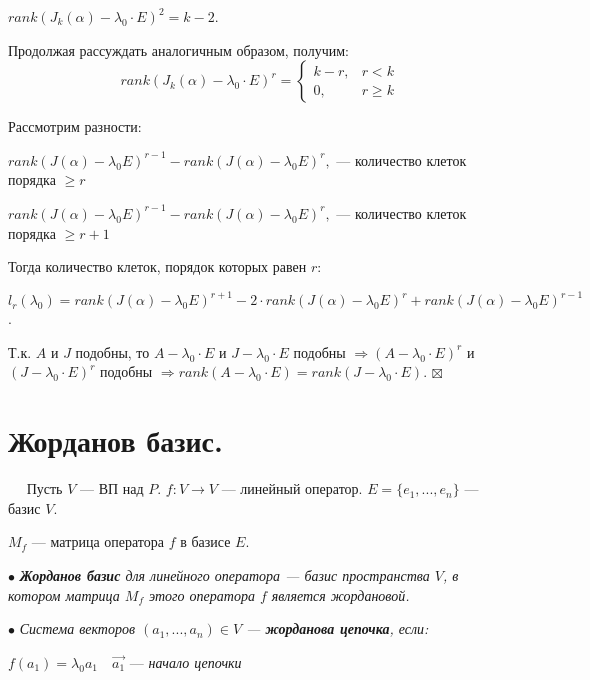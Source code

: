 \documentclass[a4paper, 12pt]{report}
\begin{document}
	$rank(J_k(\alpha) - \lambda_0\cdot E)^2 = k - 2$.
	
	Продолжая рассуждать аналогичным образом, получим:
	\begin{equation*}
		rank(J_k(\alpha) - \lambda_0\cdot E)^r = 
		\begin{cases}
			k - r, & r < k\\
			0, & r \geqslant k
		\end{cases}
	\end{equation*}    
	
	Рассмотрим разности:
	
	$rank(J(\alpha) - \lambda_0 E)^{r - 1} - rank(J(\alpha) - \lambda_0 E)^r,$ --- количество клеток порядка $\geqslant r$
	
	$rank(J(\alpha) - \lambda_0 E)^{r - 1} - rank(J(\alpha) - \lambda_0 E)^r,$ --- количество клеток порядка $\geqslant r + 1$
	
	Тогда количество клеток, порядок которых равен $r$:
	
	$l_r(\lambda_0) = rank(J(\alpha) - \lambda_0 E)^{r + 1} - 2 \cdot rank(J(\alpha) - \lambda_0 E)^{r} + rank(J(\alpha) - \lambda_0 E)^{r - 1}$.
	
	Т.к. $A$ и $J$ подобны, то $A - \lambda_0 \cdot E$ и $J - \lambda_0 \cdot E$ подобны $\Rightarrow (A - \lambda_0 \cdot E)^r$ и $(J - \lambda_0 \cdot E)^r$ подобны $\Rightarrow rank(A - \lambda_0 \cdot E) = rank(J - \lambda_0 \cdot E)$. $\boxtimes$
	
	
	
	
	
	
	
	
	
	
	
	\section{Жорданов базис.}
	$\quad$ Пусть $V$ --- ВП над $P$. $f:V\longrightarrow V$ --- линейный оператор. $E = \{e_1, ..., e_n\}$ --- базис $V$.
	
	$M_f$ --- матрица оператора $f$ в базисе $E$.
	\par\bigskip
	$\bullet$ \textit{\textbf{Жорданов базис} для линейного оператора --- базис пространства $V$, в котором матрица $M_f$ этого оператора $f$ является жордановой.}
	\par\bigskip
	$\bullet$ \textit{Система векторов $(a_1, ..., a_n) \in V$ --- \textbf{жорданова цепочка}, если:} 
	\par\bigskip
	
	$f(a_1) = \lambda_0 a_1 \quad \vec{a_1}$ --- \textit{начало цепочки}
	
\end{document}
